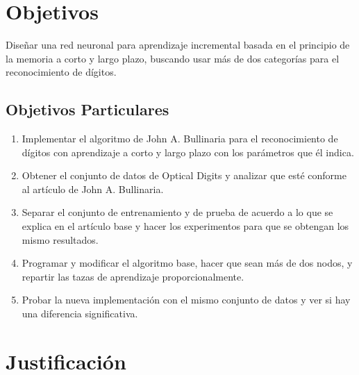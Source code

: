 \section{Objetivos}
    Diseñar una red neuronal para aprendizaje incremental basada en el principio de la memoria a corto y largo plazo, buscando usar más de dos categorías para el reconocimiento de dígitos.
    \subsection{Objetivos Particulares}
        \begin{enumerate}
            \item Implementar el algoritmo de John A. Bullinaria para el reconocimiento de dígitos con aprendizaje a corto y largo plazo con los parámetros que él indica.
            \item Obtener el conjunto de datos de Optical Digits y analizar que esté conforme al artículo de John A. Bullinaria.
            \item Separar el conjunto de entrenamiento y de prueba de acuerdo a lo que se explica en el artículo base y hacer los experimentos para que se obtengan los mismo resultados.
            \item Programar y modificar el algoritmo base, hacer que sean más de dos nodos, y repartir las tazas de aprendizaje proporcionalmente.
            \item Probar la nueva implementación con el mismo conjunto de datos y ver si hay una diferencia significativa.
        \end{enumerate}
\section{Justificaci\'on}

